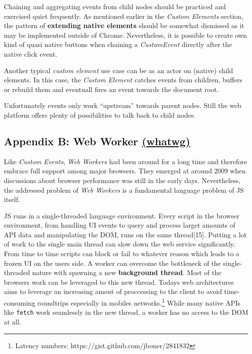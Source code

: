 \documentclass[]{assets/latex/ieee}
\begin{document}
Chaining and aggregating events from child nodes should be practiced and
exercised quiet frequently. As mentioned earlier in the \emph{Custom
Elements} section, the pattern of \textbf{extending native elements}
should be somewhat dismissed as it may be implemented outside of Chrome.
Nevertheless, it is possible to create own kind of quasi native buttons
when chaining a \emph{CustomEvent} directly after the native click
event.

Another typical \emph{custom element} use case can be as an actor on
(native) child elements. In this case, the \emph{Custom Element} catches
events from children, buffers or rebuild them and eventuall fires an
event towards the document root.

Unfortunately events only work ``upstream'' towards parent nodes. Still
the web platform offers plenty of possibilities to talk back to child
nodes.

\subsection{\texorpdfstring{Appendix B: Web Worker
\href{https://html.spec.whatwg.org/multipage/workers.html}{(whatwg)}}{Appendix B: Web Worker (whatwg)}}\label{appendix-b-web-worker-whatwg}

Like \emph{Custom Events}, \emph{Web Workers} had been around for a long
time and therefore embrace full support among major browsers. They
emerged at around 2009 when discussions about browser performance was
still in the early days. Nevertheless, the addressed problem of
\emph{Web Workers} is a fundamental language problem of JS itself.

JS runs in a single-threaded language environment. Every script in the
browser environment, from handling UI events to query and process larget
amounts of API data and manipulating the DOM, runs on the same
thread{[}15{]}. Putting a lot of work to the single main thread can slow
down the web service significantly. From time to time scripts can block
or fail to whatever reason which leads to a frozen UI on the users side.
A worker can overcome the bottleneck of the single-threaded nature with
spawning a new \textbf{background thread}. Most of the browsers work can
be leveraged to this new thread. Todays web architectures aims to
leverage an increasing amout of proccessing to the client to avoid
time-consuming roundtrips especially in mobiles networks.\footnote{Latency
  numbers: https://gist.github.com/jboner/2841832} While many native
APIs like \texttt{fetch} work seamlessly in the new thread, a worker has
no access to the DOM at all.
\end{document}
